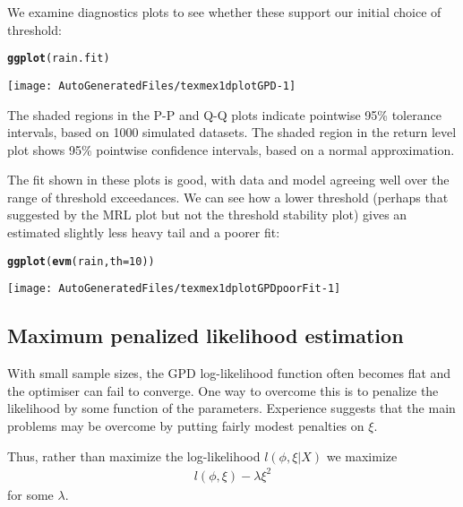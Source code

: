 \documentclass[10pt]{article}\usepackage[]{graphicx}\usepackage[]{color}
\makeatletter
\def\maxwidth{ %
  \ifdim\Gin@nat@width>\linewidth
    \linewidth
  \else
    \Gin@nat@width
  \fi
}
\newcommand{\hlnum}[1]{\textcolor[rgb]{0.686,0.059,0.569}{#1}}%
\newcommand{\hlstd}[1]{\textcolor[rgb]{0.345,0.345,0.345}{#1}}%
\newcommand{\hlkwc}[1]{\textcolor[rgb]{0.333,0.667,0.333}{#1}}%
\newcommand{\hlkwd}[1]{\textcolor[rgb]{0.737,0.353,0.396}{\textbf{#1}}}%
\newenvironment{kframe}{%
 \def\at@end@of@kframe{}%
 \ifinner\ifhmode%
  \def\at@end@of@kframe{\end{minipage}}%
  \begin{minipage}{\columnwidth}%
 \fi\fi%
 \def\FrameCommand##1{\hskip\@totalleftmargin \hskip-\fboxsep
 \colorbox{shadecolor}{##1}\hskip-\fboxsep
     \hskip-\linewidth \hskip-\@totalleftmargin \hskip\columnwidth}%
 \MakeFramed {\advance\hsize-\width
   \@totalleftmargin\z@ \linewidth\hsize
   \@setminipage}}%
 {\par\unskip\endMakeFramed%
 \at@end@of@kframe}
\newenvironment{knitrout}{}{} %
\makeatother
\begin{document}
We examine diagnostics plots to see whether these support our initial choice of threshold:
\begin{knitrout}
\color{fgcolor}\begin{kframe}
\begin{alltt}
\hlkwd{ggplot}\hlstd{(rain.fit)}
\end{alltt}
\end{kframe}
\texttt{[image: AutoGeneratedFiles/texmex1dplotGPD-1]} 

\end{knitrout}
The shaded regions in the P-P and Q-Q plots indicate pointwise 95\% tolerance
intervals, based on 1000 simulated datasets. The shaded region in the return level plot shows 95\% pointwise confidence intervals, based on a normal approximation.

The fit shown in these plots is good, with data and model agreeing well over the range of threshold exceedances.  We can see how a lower threshold (perhaps that suggested by the MRL plot but not the threshold stability plot) gives an estimated slightly less heavy tail and a poorer fit:
\begin{knitrout}
\color{fgcolor}\begin{kframe}
\begin{alltt}
\hlkwd{ggplot}\hlstd{(}\hlkwd{evm}\hlstd{(rain,}\hlkwc{th}\hlstd{=}\hlnum{10}\hlstd{))}
\end{alltt}
\end{kframe}
\texttt{[image: AutoGeneratedFiles/texmex1dplotGPDpoorFit-1]} 

\end{knitrout}
%
\subsection{Maximum penalized likelihood estimation}
\label{section:MPLE}
%
With small sample sizes, the GPD log-likelihood function
often becomes flat and the optimiser can fail to converge.
One way to overcome this is to penalize the likelihood by
some function of the parameters. Experience suggests that
the main problems may be overcome by putting fairly modest
penalties on $\xi$.

Thus, rather than maximize the log-likelihood $l(\phi, \xi | X)$
we maximize
\begin{eqnarray}
l(\phi, \xi) - \lambda \xi^2 \label{eqn:MPL}
\end{eqnarray}
for some $\lambda$.
\end{document}
